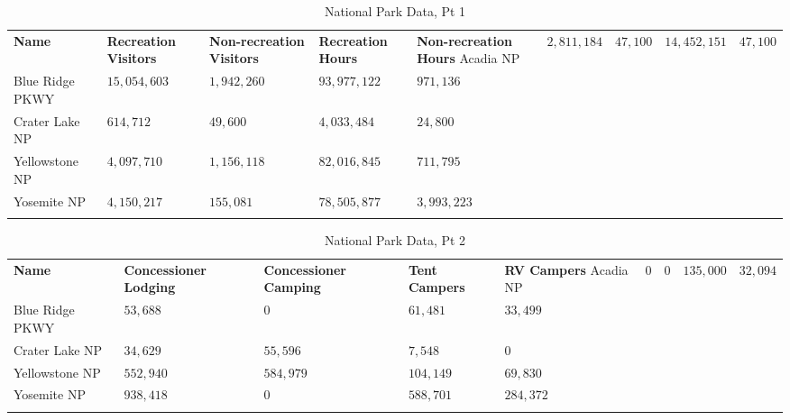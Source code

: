 \begin{table}[H]
	{\small
		\begin{longtable}{L{1.25in}L{0.70in}L{0.60in}L{0.70in}L{0.60in}} %
		\textbf{Name} & \textbf{Recreation Visitors} & \textbf{Non-recreation Visitors} & \textbf{Recreation Hours} & \textbf{Non-recreation Hours} \endhead
		\hline
		Acadia NP       & $ 2,811,184 $  & $ 47,100 $    & $ 14,452,151 $ & $ 47,100 $    \\
		Blue Ridge PKWY & $ 15,054,603 $ & $ 1,942,260 $ & $ 93,977,122 $ & $ 971,136 $   \\
		Crater Lake NP  & $ 614,712 $    & $ 49,600 $    & $ 4,033,484 $  & $ 24,800 $    \\
		Yellowstone NP  & $ 4,097,710 $  & $ 1,156,118 $ & $ 82,016,845 $ & $ 711,795 $   \\
		Yosemite NP     & $ 4,150,217 $  & $ 155,081 $   & $ 78,505,877 $ & $ 3,993,223 $ \\
		\caption{National Park Data, Pt 1}
		\label{06:tab05}
		\end{longtable}
	}
\end{table}

\begin{table}[H]
	{\small
		\begin{longtable}{L{1.25in}L{0.60in}L{0.60in}L{0.60in}L{0.60in}} %
			\textbf{Name} & \textbf{Concessioner Lodging} & \textbf{Concessioner Camping} & \textbf{Tent Campers} & \textbf{RV Campers} \endhead
			\hline
			Acadia NP       & $ 0 $       & $ 0 $       & $ 135,000 $ & $ 32,094 $  \\
			Blue Ridge PKWY & $ 53,688 $  & $ 0 $       & $ 61,481 $  & $ 33,499 $  \\
			Crater Lake NP  & $ 34,629 $  & $ 55,596 $  & $ 7,548 $   & $ 0 $       \\
			Yellowstone NP  & $ 552,940 $ & $ 584,979 $ & $ 104,149 $ & $ 69,830 $  \\
			Yosemite NP     & $ 938,418 $ & $ 0 $       & $ 588,701 $ & $ 284,372 $ \\
			\caption{National Park Data, Pt 2}
			\label{06:tab06}
		\end{longtable}
	}
\end{table}

